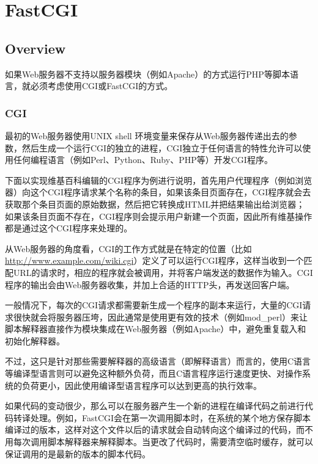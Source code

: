 \part{FastCGI}

\chapter{Overview}


如果Web服务器不支持以服务器模块（例如Apache）的方式运行PHP等脚本语言，就必须考虑使用CGI或FastCGI的方式。







\section{CGI}


最初的Web服务器使用UNIX shell 环境变量来保存从Web服务器传递出去的参数，然后生成一个运行CGI的独立的进程，CGI独立于任何语言的特性允许可以使用任何编程语言（例如Perl、Python、Ruby、PHP等）开发CGI程序。

下面以实现维基百科编辑的CGI程序为例进行说明，首先用户代理程序（例如浏览器）向这个CGI程序请求某个名称的条目，如果该条目页面存在，CGI程序就会去获取那个条目页面的原始数据，然后把它转换成HTML并把结果输出给浏览器；如果该条目页面不存在，CGI程序则会提示用户新建一个页面，因此所有维基操作都是通过这个CGI程序来处理的。


从Web服务器的角度看，CGI的工作方式就是在特定的位置（比如\url{http://www.example.com/wiki.cgi}）定义了可以运行CGI程序，这样当收到一个匹配URL的请求时，相应的程序就会被调用，并将客户端发送的数据作为输入。CGI程序的输出会由Web服务器收集，并加上合适的HTTP头，再发送回客户端。



一般情况下，每次的CGI请求都需要新生成一个程序的副本来运行，大量的CGI请求很快就会将服务器压垮，因此通常是使用更有效的技术（例如mod\_perl）来让脚本解释器直接作为模块集成在Web服务器（例如Apache）中，避免重复载入和初始化解释器。

不过，这只是针对那些需要解释器的高级语言（即解释语言）而言的，使用C语言等编译型语言则可以避免这种额外负荷，而且C语言程序运行速度更快、对操作系统的负荷更小，因此使用编译型语言程序可以达到更高的执行效率。

如果代码的变动很少，那么可以在服务器产生一个新的进程在编译代码之前进行代码转译处理。例如，FastCGI会在第一次调用脚本时，在系统的某个地方保存脚本编译过的版本，这样对这个文件以后的请求就会自动转向这个编译过的代码，而不用每次调用脚本解释器来解释脚本。当更改了代码时，需要清空临时缓存，就可以保证调用的是最新的版本的脚本代码。


